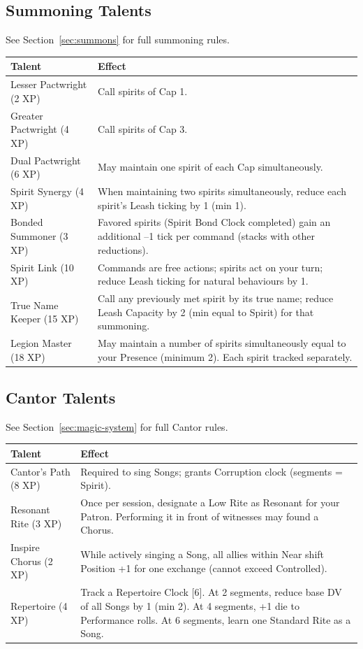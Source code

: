 \subsection{Summoning Talents}

See Section~\ref{sec:summons} for full summoning rules.

\begin{tabular}{@{}lp{10cm}@{}}
\toprule
\textbf{Talent} & \textbf{Effect} \\
\midrule
Lesser Pactwright (2 XP) & Call spirits of Cap 1. \\
Greater Pactwright (4 XP) & Call spirits of Cap 3. \\
Dual Pactwright (6 XP) & May maintain one spirit of each Cap simultaneously. \\
Spirit Synergy (4 XP) & When maintaining two spirits simultaneously, reduce each spirit's Leash ticking by 1 (min 1). \\
Bonded Summoner (3 XP) & Favored spirits (Spirit Bond Clock completed) gain an additional –1 tick per command (stacks with other reductions). \\
Spirit Link (10 XP) & Commands are free actions; spirits act on your turn; reduce Leash ticking for natural behaviours by 1. \\
True Name Keeper (15 XP) & Call any previously met spirit by its true name; reduce Leash Capacity by 2 (min equal to Spirit) for that summoning. \\
Legion Master (18 XP) & May maintain a number of spirits simultaneously equal to your Presence (minimum 2). Each spirit tracked separately. \\
\bottomrule
\end{tabular}

\subsection{Cantor Talents}

See Section~\ref{sec:magic-system} for full Cantor rules.

\begin{tabular}{@{}lp{10cm}@{}}
\toprule
\textbf{Talent} & \textbf{Effect} \\
\midrule
Cantor's Path (8 XP) & Required to sing Songs; grants Corruption clock (segments = Spirit). \\
Resonant Rite (3 XP) & Once per session, designate a Low Rite as Resonant for your Patron. Performing it in front of witnesses may found a Chorus. \\
Inspire Chorus (2 XP) & While actively singing a Song, all allies within Near shift Position +1 for one exchange (cannot exceed Controlled). \\
Repertoire (4 XP) & Track a Repertoire Clock [6]. At 2 segments, reduce base DV of all Songs by 1 (min 2). At 4 segments, +1 die to Performance rolls. At 6 segments, learn one Standard Rite as a Song. \\
\bottomrule
\end{tabular}

